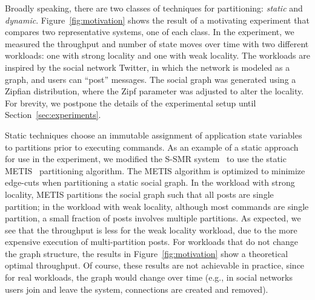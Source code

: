 Broadly speaking, there are two classes of techniques for
partitioning: \emph{static} and \emph{dynamic}.
Figure~\ref{fig:motivation} shows the result of a motivating
experiment that compares two representative systems, one of each class. In the
experiment, we measured the throughput and number of state moves over
time with two different workloads: one with strong locality and one
with weak locality. The workloads are inspired by the social network
Twitter, in which the network is modeled as a graph, and users can
``post'' messages. The social graph was generated using a Zipfian
distribution, where the Zipf parameter was adjusted to alter the
locality.  For brevity, we postpone the details of the experimental
setup until Section~\ref{sec:experiments}.


Static techniques choose an immutable assignment of application state variables to partitions
prior to executing commands. As an example of a static approach for
use in the experiment, we modified the S-SMR
system~\cite{bezerra2014ssmr} to use the static
METIS~\cite{Abou-Rjeili:2006} partitioning algorithm.  The METIS
algorithm is optimized to minimize edge-cuts when partitioning a
static social graph. 
In the workload with strong locality, METIS partitions the social graph such that all posts are single partition;
in the workload with weak locality, although most commands are single partition, a small fraction of posts involves multiple partitions.
As expected, we see that the throughput is less
for the weak locality workload, due to the more expensive execution of multi-partition posts.
For workloads that do not change the graph structure, the
results in Figure~\ref{fig:motivation} show a theoretical optimal
throughput.  Of course, these results are not achievable in practice,
since for real workloads, the graph would change over time (e.g., in
social networks users join and leave the system, connections are
created and removed).


